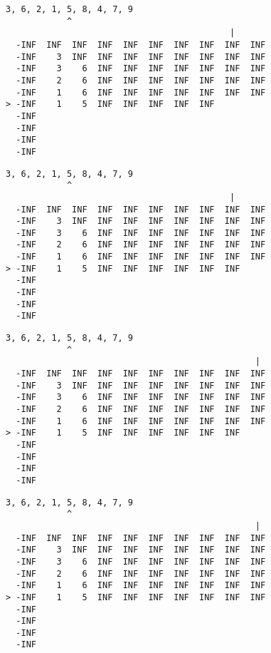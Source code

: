 { \begin{verbatim}
3, 6, 2, 1, 5, 8, 4, 7, 9
            ^
                                            |
  -INF  INF  INF  INF  INF  INF  INF  INF  INF  INF
  -INF    3  INF  INF  INF  INF  INF  INF  INF  INF
  -INF    3    6  INF  INF  INF  INF  INF  INF  INF
  -INF    2    6  INF  INF  INF  INF  INF  INF  INF
  -INF    1    6  INF  INF  INF  INF  INF  INF  INF
> -INF    1    5  INF  INF  INF  INF  INF          
  -INF                                             
  -INF                                             
  -INF                                             
  -INF                                             
\end{verbatim} }

{ \begin{verbatim}
3, 6, 2, 1, 5, 8, 4, 7, 9
            ^
                                            |
  -INF  INF  INF  INF  INF  INF  INF  INF  INF  INF
  -INF    3  INF  INF  INF  INF  INF  INF  INF  INF
  -INF    3    6  INF  INF  INF  INF  INF  INF  INF
  -INF    2    6  INF  INF  INF  INF  INF  INF  INF
  -INF    1    6  INF  INF  INF  INF  INF  INF  INF
> -INF    1    5  INF  INF  INF  INF  INF  INF     
  -INF                                             
  -INF                                             
  -INF                                             
  -INF                                             
\end{verbatim} }

{ \begin{verbatim}
3, 6, 2, 1, 5, 8, 4, 7, 9
            ^
                                                 |
  -INF  INF  INF  INF  INF  INF  INF  INF  INF  INF
  -INF    3  INF  INF  INF  INF  INF  INF  INF  INF
  -INF    3    6  INF  INF  INF  INF  INF  INF  INF
  -INF    2    6  INF  INF  INF  INF  INF  INF  INF
  -INF    1    6  INF  INF  INF  INF  INF  INF  INF
> -INF    1    5  INF  INF  INF  INF  INF  INF     
  -INF                                             
  -INF                                             
  -INF                                             
  -INF                                             
\end{verbatim} }

{ \begin{verbatim}
3, 6, 2, 1, 5, 8, 4, 7, 9
            ^
                                                 |
  -INF  INF  INF  INF  INF  INF  INF  INF  INF  INF
  -INF    3  INF  INF  INF  INF  INF  INF  INF  INF
  -INF    3    6  INF  INF  INF  INF  INF  INF  INF
  -INF    2    6  INF  INF  INF  INF  INF  INF  INF
  -INF    1    6  INF  INF  INF  INF  INF  INF  INF
> -INF    1    5  INF  INF  INF  INF  INF  INF  INF
  -INF                                             
  -INF                                             
  -INF                                             
  -INF                                             
\end{verbatim} }

